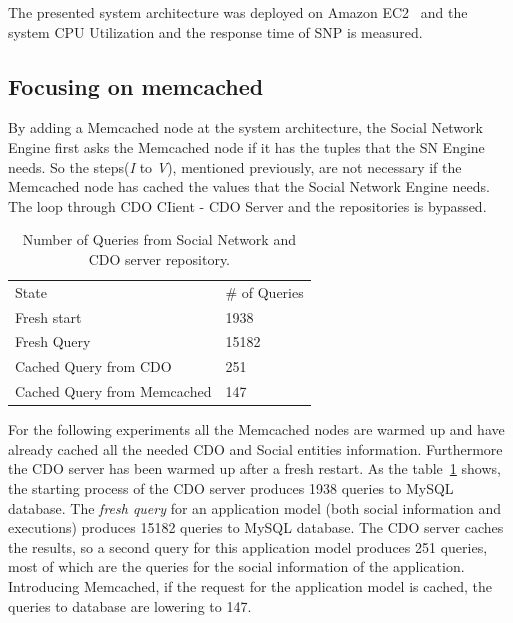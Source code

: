 The presented system architecture was deployed on Amazon EC2~\cite{amazon_url} and the system CPU Utilization and the response time of SNP is measured.

\subsection{Focusing on memcached}
\label{sec:eval_memcache}
By adding a Memcached node at the system architecture, the Social Network Engine first asks the Memcached node if it has the tuples that the SN Engine needs. So the steps(\emph{I} to \emph{V}), mentioned previously, are not necessary if the Memcached node has cached the values that the Social Network Engine needs. The loop through CDO CIient - CDO Server and the repositories is bypassed. 

\begin{table}[]
\centering
\caption{Number of Queries from Social Network and CDO server repository.}
\label{tab:num_of_queries}
\begin{tabular}{ll}
State        & \# of Queries \\
Fresh start  & 1938          \\
Fresh Query  & 15182         \\
Cached Query from CDO & 251           \\
Cached Query from Memcached & 147  
\end{tabular}
\end{table} 

For the following experiments all the Memcached nodes are warmed up and have already cached all the needed CDO and Social entities information. Furthermore the CDO server has been warmed up after a fresh restart. As the table~\ref{tab:num_of_queries} shows,
the starting process of the CDO server produces 1938 queries to MySQL database. The \emph{fresh query} for an application model (both social information and executions) produces 15182 queries to MySQL database. The CDO server caches the results, so a second query for this application model produces 251 queries, most of which are the queries for the social information of the application. Introducing Memcached, if the request for the application model is cached, the queries to database are lowering to 147.  

